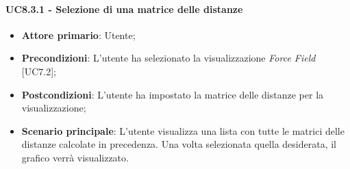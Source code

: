 \paragraph{UC8.3.1 - Selezione di una matrice delle distanze}
\begin{itemize}
	\item \textbf{Attore primario}: Utente;
	\item \textbf{Precondizioni}: L'utente ha selezionato la visualizzazione \textit{Force Field} [UC7.2];
	\item \textbf{Postcondizioni}: L'utente ha impostato la matrice delle distanze per la visualizzazione;
	
	\item \textbf{Scenario principale}: L'utente visualizza una lista con tutte le matrici delle distanze calcolate in precedenza. Una volta selezionata quella desiderata, il grafico verrà visualizzato.
\end{itemize}